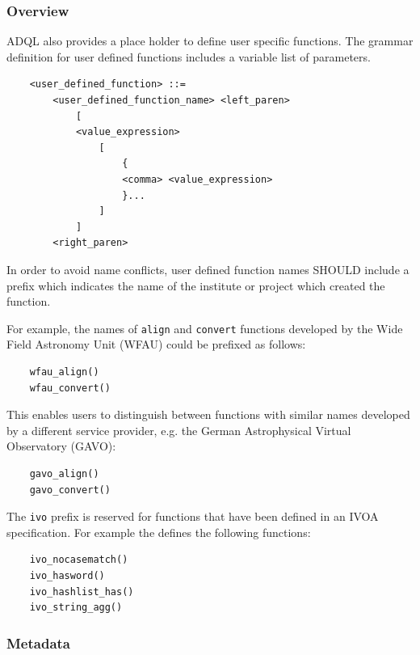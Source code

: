 \documentclass[11pt,a4paper]{ivoa}
\begin{document}
\subsubsection{Overview}

ADQL also provides a place holder to define user specific functions. The grammar
definition for user defined functions includes a variable list of parameters.

\begin{verbatim}
    <user_defined_function> ::=
        <user_defined_function_name> <left_paren>
            [
            <value_expression>
                [
                    {
                    <comma> <value_expression>
                    }...
                ]
            ]
        <right_paren>
\end{verbatim}

In order to avoid name conflicts, user defined function names SHOULD include
a prefix which indicates the name of the institute or project which created
the function.

For example, the names of \verb:align: and \verb:convert: functions developed
by the Wide Field Astronomy Unit (WFAU) could be prefixed as follows:
\begin{verbatim}
    wfau_align()
    wfau_convert()
\end{verbatim}

This enables users to distinguish between functions with similar names developed
by a different service provider, e.g. the German Astrophysical Virtual
Observatory (GAVO):
\begin{verbatim}
    gavo_align()
    gavo_convert()
\end{verbatim}

The \verb:ivo: prefix is reserved for functions that have been defined
in an IVOA specification. For example the \RegTAPSpec defines the following
functions:
\begin{verbatim}
    ivo_nocasematch()
    ivo_hasword()
    ivo_hashlist_has()
    ivo_string_agg()
\end{verbatim}


\subsubsection{Metadata}
\label{sec:user.metadata}
\end{document}
